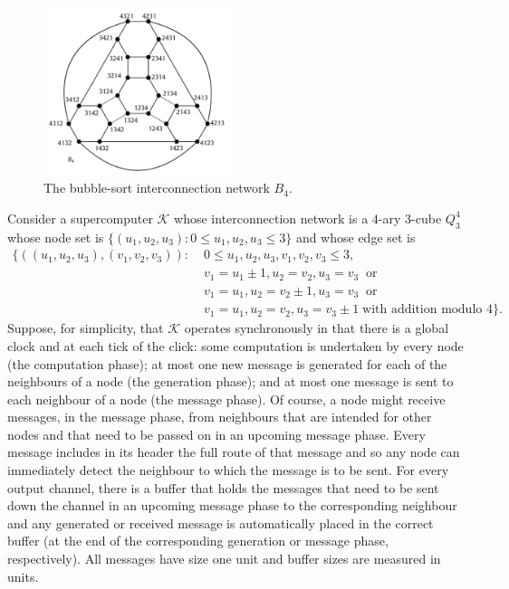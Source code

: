   \begin{figure}
      \centering
      \includegraphics[width=0.5\textwidth]{fig-2}
      \caption{The bubble-sort interconnection network $B_4$.}
  \end{figure}

  \question Consider a supercomputer $\mathcal K$ whose interconnection network is a $4$-ary $3$-cube $Q_3^4$ whose node set is $\{(u_1, u_2, u_3): 0 \leq u_1, u_2, u_3 \leq 3\}$ and whose edge set is
  \begin{align*}
    \{
      ((u_1, u_2, u_3), (v_1, v_2, v_3)):
        &\; 0 \leq u_1, u_2, u_3, v_1, v_2, v_3 \leq 3, \\
        &\; v_1 = u_1 \pm 1, u_2 = v_2, u_3 = v_3 \;\;\text{or} \\
        &\; v_1 = u_1, u_2 = v_2 \pm 1, u_3 = v_3 \;\;\text{or} \\
        &\; v_1 = u_1, u_2 = v_2, u_3 = v_3 \pm 1 \;\text{with addition modulo $4$}
    \}.
  \end{align*}
  Suppose, for simplicity, that $\mathcal K$ operates synchronously in that there is a global clock and at each tick of the click: some computation is undertaken by every node (the computation phase); at most one new message is generated for each of the neighbours of a node (the generation phase); and at most one message is sent to each neighbour of a node (the message phase). Of course, a node might receive messages, in the message phase, from neighbours that are intended for other nodes and that need to be passed on in an upcoming message phase. Every message includes in its header the full route of that message and so any node can immediately detect the neighbour to which the message is to be sent. For every output channel, there is a buffer that holds the messages that need to be sent down the channel in an upcoming message phase to the corresponding neighbour and any generated or received message is automatically placed in the correct buffer (at the end of the corresponding generation or message phase, respectively). All messages have size one unit and buffer sizes are measured in units.


